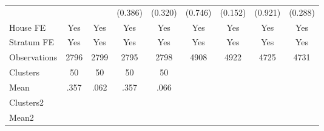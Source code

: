 {\begin{tabular}{l*{8}{c}}
                &                  &                  &  (0.386)         &  (0.320)         &  (0.746)         &  (0.152)         &  (0.921)         &  (0.288)         \\
House FE        &      Yes         &      Yes         &      Yes         &      Yes         &      Yes         &      Yes         &      Yes         &      Yes         \\
Stratum FE      &      Yes         &      Yes         &      Yes         &      Yes         &      Yes         &      Yes         &      Yes         &      Yes         \\
\midrule
Observations    &     2796         &     2799         &     2795         &     2798         &     4908         &     4922         &     4725         &     4731         \\
Clusters        &       50         &       50         &       50         &       50         &                  &                  &                  &                  \\
Mean            &     .357         &     .062         &     .357         &     .066         &                  &                  &                  &                  \\
Clusters2       &                  &                  &                  &                  &                  &                  &                  &                  \\
Mean2           &                  &                  &                  &                  &                  &                  &                  &                  \\
\bottomrule
\end{tabular}
}
